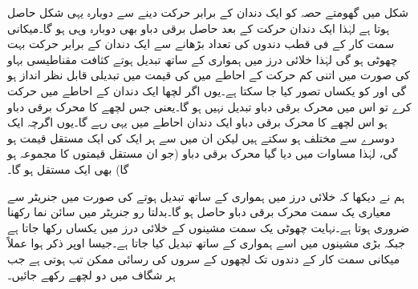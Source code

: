شکل   میں  گھومتے حصہ کو ایک دندان کے برابر حرکت دینے سے  دوبارہ یہی شکل حاصل ہوتا ہے  لہٰذا ایک دندان حرکت کے بعد حاصل برقی دباو بھی دوبارہ وہی ہو گا۔میکانی سمت کار کے فی قطب دندوں کی تعداد بڑھانے  سے ایک دندان کے برابر حرکت بہت چھوٹی ہو گی لہٰذا خلائی درز میں ہمواری کے ساتھ تبدیل ہوتے کثافت مقناطیسی بہاو کی صورت میں اتنی کم حرکت کے احاطے میں  کی قیمت میں تبدیلی قابل نظر انداز ہو گی اور  کو یکساں تصور کیا جا سکتا ہے۔یوں اگر لچھا ایک دندان کے احاطے میں حرکت کرے تو اس میں محرک برقی دباو تبدیل نہیں ہو گا۔یعنی جس لچھے کا محرک برقی دباو   ہو اس لچھے کا  محرک برقی دباو ایک دندان احاطے میں یہی رہے گا۔یوں اگرچہ  ایک دوسرے سے مختلف ہو سکتے ہیں لیکن ان میں سے ہر ایک کی ایک مستقل قیمت ہو گی، لہٰذا  مساوات   میں دیا گیا محرک برقی دباو (جو ان مستقل قیمتوں کا مجموعہ ہو گا) بھی ایک مستقل ہو گا۔ 


ہم نے دیکھا کہ خلائی درز میں  ہمواری کے ساتھ تبدیل  ہوتے  کی صورت میں جنریٹر سے معیاری یک سمت  محرک برقی دباو حاصل ہو گا۔بدلتا رو جنریٹر میں  سائن نما رکھنا ضروری ہوتا ہے۔نہایت چھوٹی یک سمت  مشینوں کے خلائی درز میں   یکساں رکھا جاتا ہے جبکہ بڑی مشینوں میں اسے ہمواری کے ساتھ تبدیل کیا جاتا ہے۔جیسا اوپر ذکر ہوا عملاً میکانی سمت کار کے دندوں تک لچھوں کے سروں کی رسائی ممکن تب ہوتی ہے جب ہر شگاف میں دو لچھے رکھے جائیں۔

